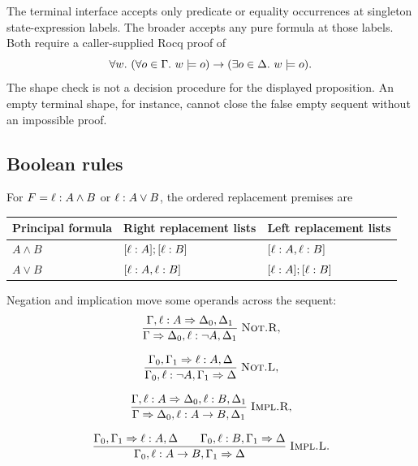 The terminal interface  accepts only predicate or equality
occurrences at singleton state-expression labels. The broader
 accepts any pure formula at those labels. Both require a
caller-supplied Rocq proof of
\[
 \forall w.\ (\forall o\in\Gamma.\ w\sat o)
                 \to(\exists o\in\Delta.\ w\sat o).
\]
The shape check is not a decision procedure for the displayed proposition.
An empty terminal shape, for instance, cannot close the false empty sequent
without an impossible proof.

\subsection{Boolean rules}
For $F=\ann{\ell}{A\land B}$ or $\ann{\ell}{A\lor B}$, the ordered
replacement premises are
\begin{center}
\begin{tabular}{@{}lll@{}}
\toprule
Principal formula & Right replacement lists & Left replacement lists\\
\midrule
$A\land B$ & $[\ann{\ell}{A}];[\ann{\ell}{B}]$
             & $[\ann{\ell}{A},\ann{\ell}{B}]$\\
$A\lor B$ & $[\ann{\ell}{A},\ann{\ell}{B}]$
             & $[\ann{\ell}{A}];[\ann{\ell}{B}]$\\
\bottomrule
\end{tabular}
\end{center}

Negation and implication move some operands across the sequent:
\begin{gather*}
 \Rule{Not.R}{\seq{\Gamma,\ann{\ell}{A}}{\Delta_0,\Delta_1}}
   {\seq{\Gamma}{\Delta_0,\ann{\ell}{\neg A},\Delta_1}},\\[0.8em]
 \Rule{Not.L}{\seq{\Gamma_0,\Gamma_1}{\ann{\ell}{A},\Delta}}
   {\seq{\Gamma_0,\ann{\ell}{\neg A},\Gamma_1}{\Delta}},\\[0.8em]
 \Rule{Impl.R}{\seq{\Gamma,\ann{\ell}{A}}{\Delta_0,\ann{\ell}{B},\Delta_1}}
   {\seq{\Gamma}{\Delta_0,\ann{\ell}{A\to B},\Delta_1}},\\[0.8em]
 \Rule{Impl.L}{\seq{\Gamma_0,\Gamma_1}{\ann{\ell}{A},\Delta}
       \qquad\seq{\Gamma_0,\ann{\ell}{B},\Gamma_1}{\Delta}}
   {\seq{\Gamma_0,\ann{\ell}{A\to B},\Gamma_1}{\Delta}}.
\end{gather*}

